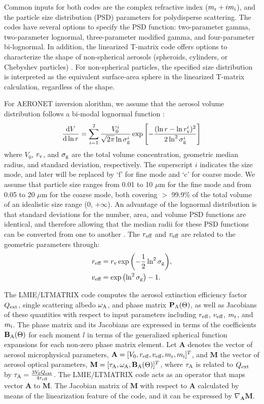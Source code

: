 Common inputs for both codes are the complex refractive index
($m_\text{r} + im_\text{i}$), and the particle size distribution (PSD) 
parameters for polydisperse scattering. The codes have several options 
to specify the PSD function: two-parameter gamma, two-parameter 
lognormal, three-parameter modified gamma, and four-parameter bi-lognormal. 
In addition, the linearized T-matrix code offers options to characterize the 
shape of non-spherical aerosols (spheroids, cylinders, or Chebyshev particles)
\citep{Spurr12}. For non-spherical particles, the specified size distribution 
is interpreted as the equivalent surface-area sphere in the linearized T-matrix
calculation, regardless of the shape. 

For AERONET inversion alorithm, we assume that the aerosol volume
distribution follows a bi-modal lognormal function \citep[in agreement
wit][]{Schuster06, Waquet09}:
\begin{equation}
\frac{\text{d}V}{\text{d}\ln{r}} = \sum_{i=1}^2 
\frac{V_0^i}{\sqrt{2\pi}\ln{\sigma_\text{g}^i}} 
\exp{\left[ -\frac{(\ln{r}-\ln{r_\text{v}^i})^2}{2\ln^2{\sigma_\text{g}^i}}\right]}
\label{eq:bilognormal}
\end{equation}
where $V_0$, $r_\text{v}$, and $\sigma_\text{g}$ are the total volume concentration, geometric
median radius, and standard deviation, respectively. The superscript $i$
indicates the size mode, and later will be replaced by ‘f’ for fine mode
and ‘c’ for coarse mode. We assume that particle size ranges from 0.01
to 10 $\mu$m for the fine mode and from 0.05 to 20 $\mu$m for
the coarse mode, both covering $>$ 99.9\% of the total volume of an 
idealistic size range (0, $+\infty$). An advantage of the lognormal 
distribution is that standard deviations for the number, area, and 
volume PSD functions are identical, and therefore allowing that the 
median radii for these PSD functions can be converted from one to 
another \citep{Seinfeld06}. The $r_\text{eff}$ and $v_\text{eff}$ are related to 
the geometric parameters through:
\begin{align}
r_\text{eff} &= r_\text{v} \exp{\left( -\frac{1}{2} \ln^2{\sigma_\text{g}}\right)}, \\
v_\text{eff} & = \exp{\left(\ln^2{\sigma_\text{g}}\right)} - 1.
\end{align}

The LMIE/LTMATRIX code computes the aerosol extinction efficiency
factor $Q_\text{ext}$, single scattering albedo $\omega_\text{A}$, and phase matrix 
$\mathbf{P}_\text{A}(\Theta)$, as well as Jacobians of these quantities with respect
to input parameters including $r_\text{eff}$, $v_\text{eff}$, $m_\text{r}$, and $m_\text{i}$.
The phase matrix and its Jacobians are expressed in terms of the
coefficients $\mathbf{B}_\text{A}(\Theta)$ for each moment $l$ in terms of the 
generalized spherical function expansions
for each non-zero phase matrix element. Let $\mathbf{A}$ denotes the
vector of aerosol microphysical parameters, 
$\mathbf{A}=[V_0,r_\text{eff},v_\text{eff},m_\text{r},m_\text{i}]^T$, and $\mathbf{M}$
the vector of aerosol optical parameters, 
$\mathbf{M}=[\tau_\text{A},\omega_\text{A},\mathbf{B}_\text{A}(\Theta)]^T$, 
where $\tau_\text{A}$ is related to $Q_\text{ext}$ by 
$\tau_\text{A}=\frac{3V_0 Q_\text{ext}}{4r_\text{eff}}$. The LMIE/LTMATRIX code acts
as an operator that maps vector $\mathbf{A}$ to $\mathbf{M}$. 
The Jacobian matrix of $\mathbf{M}$ with respect to $\mathbf{A}$ calculated by 
means of the linearization feature of the code, and it can be expressed by
$\nabla_\mathbf{A}\mathbf{M}$. 


